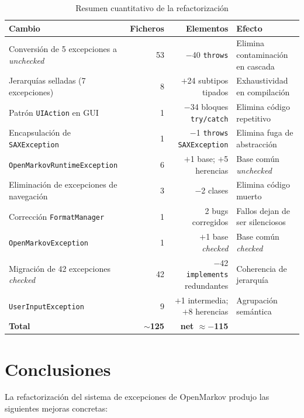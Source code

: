 \documentclass[12pt,a4paper]{article}
\begin{document}
\begin{table}[H]
\centering
\begin{tabularx}{\textwidth}{p{6.2cm}rrX}
\toprule
Cambio & Ficheros & Elementos & Efecto \\
\midrule
Conversión de 5 excepciones a \textit{unchecked}
  & 53 & $-$40 \texttt{throws}
  & Elimina contaminación en cascada \\
Jerarquías selladas (7 excepciones)
  & 8 & $+$24 subtipos tipados
  & Exhaustividad en compilación \\
Patrón \texttt{UIAction} en GUI
  & 1 & $-$34 bloques \texttt{try/catch}
  & Elimina código repetitivo \\
Encapsulación de \texttt{SAXException}
  & 1 & $-$1 \texttt{throws SAXException}
  & Elimina fuga de abstracción \\
\texttt{OpenMarkovRuntimeException}
  & 6 & $+$1 base; $+$5 herencias
  & Base común \textit{unchecked} \\
Eliminación de excepciones de navegación
  & 3 & $-$2 clases
  & Elimina código muerto \\
Corrección \texttt{FormatManager}
  & 1 & 2 bugs corregidos
  & Fallos dejan de ser silenciosos \\
\texttt{OpenMarkovException}
  & 1 & $+$1 base \textit{checked}
  & Base común \textit{checked} \\
Migración de 42 excepciones \textit{checked}
  & 42 & $-$42 \texttt{implements} redundantes
  & Coherencia de jerarquía \\
\texttt{UserInputException}
  & 9 & $+$1 intermedia; $+$8 herencias
  & Agrupación semántica \\
\midrule
\textbf{Total}
  & \textbf{$\sim$125}
  & \textbf{net $\approx -$115}
  & \\
\bottomrule
\end{tabularx}
\caption{Resumen cuantitativo de la refactorización}
\label{tab:impacto}
\end{table}

\section{Conclusiones}
\label{sec:conclusiones}

La refactorización del sistema de excepciones de OpenMarkov produjo las siguientes
mejoras concretas:
\end{document}
